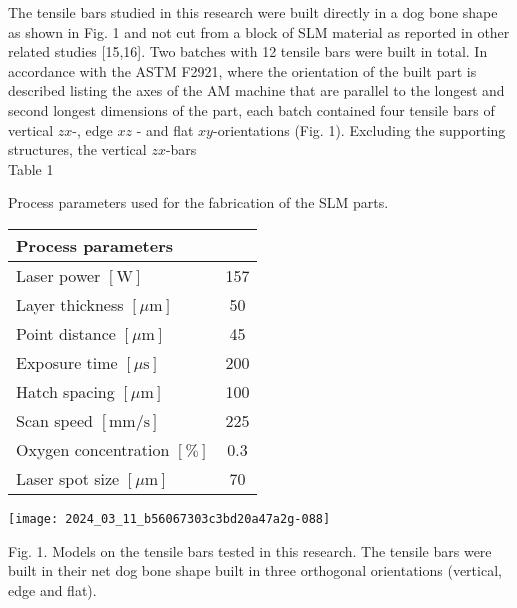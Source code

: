 \documentclass[10pt]{article}
\begin{document}
The tensile bars studied in this research were built directly in a dog bone shape as shown in Fig. 1 and not cut from a block of SLM material as reported in other related studies [15,16]. Two batches with 12 tensile bars were built in total. In accordance with the ASTM F2921, where the orientation of the built part is described listing the axes of the AM machine that are parallel to the longest and second longest dimensions of the part, each batch contained four tensile bars of vertical $z x$-, edge $x z$ - and flat $x y$-orientations (Fig. 1). Excluding the supporting structures, the vertical $z x$-bars\\
Table 1

Process parameters used for the fabrication of the SLM parts.

\begin{center}
\begin{tabular}{lc}
\hline
Process parameters &  \\
\hline
Laser power $[\mathrm{W}]$ & 157 \\
Layer thickness $[\mu \mathrm{m}]$ & 50 \\
Point distance $[\mu \mathrm{m}]$ & 45 \\
Exposure time $[\mu \mathrm{s}]$ & 200 \\
Hatch spacing $[\mu \mathrm{m}]$ & 100 \\
Scan speed $[\mathrm{mm} / \mathrm{s}]$ & 225 \\
Oxygen concentration $[\%]$ & 0.3 \\
Laser spot size $[\mu \mathrm{m}]$ & 70 \\
\hline
\end{tabular}
\end{center}

\begin{center}
\texttt{[image: 2024\_03\_11\_b56067303c3bd20a47a2g-088]}
\end{center}

Fig. 1. Models on the tensile bars tested in this research. The tensile bars were built in their net dog bone shape built in three orthogonal orientations (vertical, edge and flat).
\end{document}
